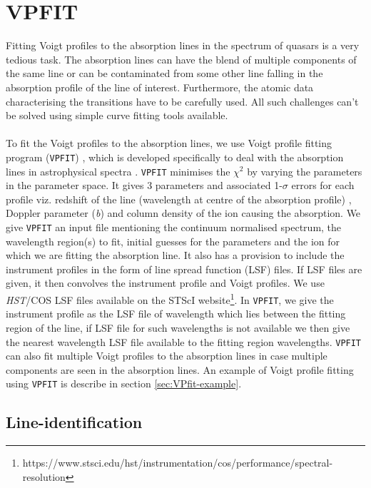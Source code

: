 \section{VPFIT}

Fitting Voigt profiles to the absorption lines in the spectrum of quasars is a very tedious task. The absorption lines can have the blend of multiple components of the same line or can be contaminated from some other line falling in the absorption profile of the line of interest. Furthermore, the atomic data characterising the transitions have to be carefully used.  All such challenges can't be solved using simple curve fitting tools available. 
\\\\
To fit the Voigt profiles to the absorption lines, we use Voigt profile fitting program ({\tt VPFIT}) \citep{vpfit}, which is developed specifically to deal with the absorption lines in astrophysical spectra . {\tt VPFIT} minimises the $\chi^2$ by varying the parameters in the parameter space. It gives 3 parameters and associated 1-$\sigma$ errors for each profile viz. redshift of the line (wavelength at centre of the absorption profile) , Doppler parameter (\emph{b}) and column density of the ion causing the absorption. We give {\tt VPFIT} an input file mentioning the continuum normalised spectrum, the wavelength region(s) to fit, initial guesses for the parameters and the ion for which we are fitting the absorption line. It also has a provision to include the instrument profiles in the form of line spread function (LSF) files. If LSF files are given, it then convolves the instrument profile and Voigt profiles. We use \textit{HST}/COS LSF files available on the STScI website\footnote{https://www.stsci.edu/hst/instrumentation/cos/performance/spectral-resolution}. In {\tt VPFIT}, we give the instrument profile as the LSF file of wavelength which lies between the fitting region of the line, if LSF file for such wavelengths is not available we then give the nearest wavelength LSF file available to the fitting region wavelengths. {\tt VPFIT} can also fit multiple Voigt profiles to the absorption lines in case multiple components are seen in the absorption lines. An example of Voigt profile fitting using {\tt VPFIT} is describe in section \ref{sec:VPfit-example}.

\subsection{Line-identification}

